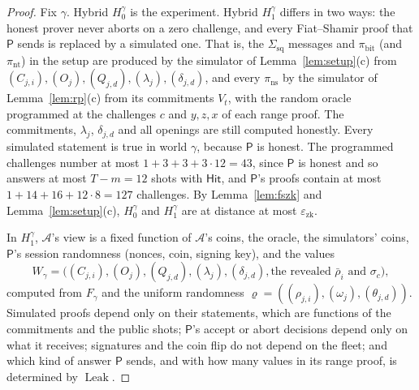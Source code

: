 \documentclass[11pt]{article}
\theoremstyle{definition}
\theoremstyle{remark}
\newcommand{\Leak}{\operatorname{Leak}}
\newcommand{\Sq}{\Sigma_{\mathrm{sq}}}
\begin{document}
\begin{proof}
Fix $\gamma$. Hybrid $H^\gamma_0$ is the experiment. Hybrid $H^\gamma_1$ differs in two ways: the honest prover never aborts on a zero challenge, and every Fiat--Shamir proof that $\mathsf P$ sends is replaced by a simulated one. That is, the $\Sq$ messages and $\pi_{\mathrm{bit}}$ (and $\pi_{\mathrm{nt}}$) in the setup are produced by the simulator of Lemma~\ref{lem:setup}(c) from $(C_{j,i}),(O_j),(Q_{j,d}),(\lambda_j),(\delta_{j,d})$, and every $\pi_{\mathrm{ns}}$ by the simulator of Lemma~\ref{lem:rp}(c) from its commitments $V_t$, with the random oracle programmed at the challenges $c$ and $y,z,x$ of each range proof. The commitments, $\lambda_j$, $\delta_{j,d}$ and all openings are still computed honestly. Every simulated statement is true in world $\gamma$, because $\mathsf P$ is honest. The programmed challenges number at most $1+3+3+3\cdot12=43$, since $\mathsf P$ is honest and so answers at most $T-m=12$ shots with $\mathsf{Hit}$, and $\mathsf P$'s proofs contain at most $1+14+16+12\cdot8=127$ challenges. By Lemma~\ref{lem:fszk} and Lemma~\ref{lem:setup}(c), $H^\gamma_0$ and $H^\gamma_1$ are at distance at most $\varepsilon_{\mathrm{zk}}$.

In $H^\gamma_1$, $\mathcal A$'s view is a fixed function of $\mathcal A$'s coins, the oracle, the simulators' coins, $\mathsf P$'s session randomness (nonces, coin, signing key), and the values
\[
  W_\gamma=\bigl((C_{j,i}),(O_j),(Q_{j,d}),(\lambda_j),(\delta_{j,d}),\text{the revealed }\bar\rho_i\text{ and }\sigma_c\bigr),
\]
computed from $F_\gamma$ and the uniform randomness $\varrho=((\rho_{j,i}),(\omega_j),(\theta_{j,d}))$. Simulated proofs depend only on their statements, which are functions of the commitments and the public shots; $\mathsf P$'s accept or abort decisions depend only on what it receives; signatures and the coin flip do not depend on the fleet; and which kind of answer $\mathsf P$ sends, and with how many values in its range proof, is determined by $\Leak$.


\end{proof}
\end{document}
